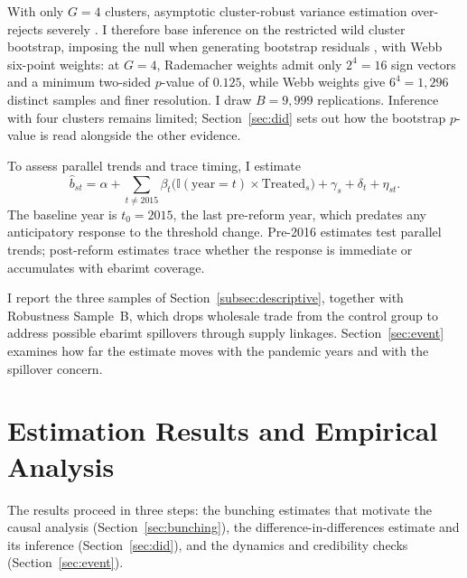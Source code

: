 \documentclass[12pt,oneside,a4paper]{report}
\begin{document}
With only $G = 4$ clusters, asymptotic cluster-robust variance estimation over-rejects severely \parencite{cameron2008bootstrap, mackinnon2023cluster}. I therefore base inference on the restricted wild cluster bootstrap, imposing the null when generating bootstrap residuals \parencite{mackinnon2023cluster}, with Webb six-point weights: at $G = 4$, Rademacher weights admit only $2^4 = 16$ sign vectors and a minimum two-sided $p$-value of $0.125$, while Webb weights give $6^4 = 1{,}296$ distinct samples and finer resolution. I draw $B = 9{,}999$ replications. Inference with four clusters remains limited; Section~\ref{sec:did} sets out how the bootstrap $p$-value is read alongside the other evidence.

To assess parallel trends and trace timing, I estimate
\begin{equation}
\hat{b}_{st} = \alpha
             + \sum_{t \neq 2015}\beta_t
               \bigl(\mathbb{I}(\mathrm{year} = t) \times \mathrm{Treated}_s\bigr)
             + \gamma_s + \delta_t + \eta_{st}.
\label{eq:event_study}
\end{equation}
The baseline year is $t_0 = 2015$, the last pre-reform year, which predates any anticipatory response to the threshold change. Pre-2016 estimates test parallel trends; post-reform estimates trace whether the response is immediate or accumulates with ebarimt coverage.

I report the three samples of Section~\ref{subsec:descriptive}, together with Robustness Sample~B, which drops wholesale trade from the control group to address possible ebarimt spillovers through supply linkages. Section~\ref{sec:event} examines how far the estimate moves with the pandemic years and with the spillover concern.


\chapter{Estimation Results and Empirical Analysis}
\label{ch:results}

The results proceed in three steps: the bunching estimates that motivate the causal analysis (Section~\ref{sec:bunching}), the difference-in-differences estimate and its inference (Section~\ref{sec:did}), and the dynamics and credibility checks (Section~\ref{sec:event}).
\end{document}
